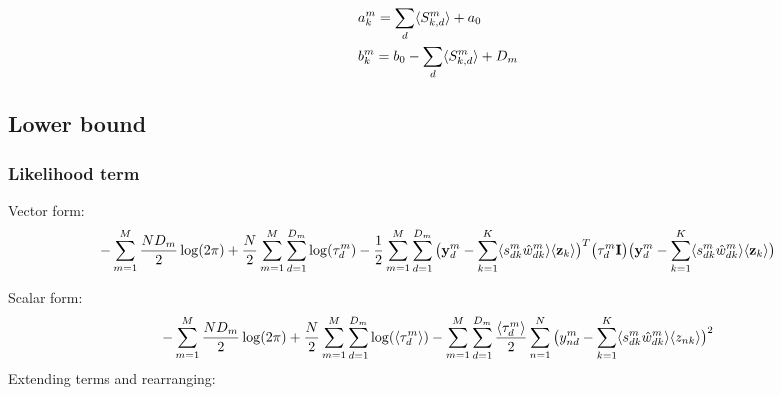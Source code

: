 \documentclass[10pt, a4paper,openany]{report}
\begin{document}
\begin{equation*}
  \begin{aligned}
    &a_{k}^m = \sum_{d} \langle S^m_{k,d}\rangle + a_0\\
    &b_{k}^m = b_0 - \sum_{d} \langle S^m_{k,d}\rangle + D_m
  \end{aligned}
\end{equation*}

\subsection{Lower bound}

\subsubsection{Likelihood term}
Vector form:
\[
-\sum_{m=1}^M \frac{ND_m}{2} \log(2\pi) + \frac{N}{2}\sum_{m=1}^{M}\sum_{d=1}^{D_m}\log(\tau_d^m) - \frac{1}{2} \sum_{m=1}^{M}\sum_{d=1}^{D_m} \big( {\bf y}_d^m - \sum_{k=1}^{K}\langle s_{dk}^m \hat{w}_{dk}^m \rangle \langle {\bf z}_k \rangle \big)^T \big( \tau_d^m {\bf I} \big) \big( {\bf y}_d^m - \sum_{k=1}^{K}\langle s_{dk}^m \hat{w}_{dk}^m \rangle \langle {\bf z}_k \rangle \big)
\]

Scalar form:
\[
-\sum_{m=1}^M \frac{ND_m}{2} \log(2\pi) + \frac{N}{2} \sum_{m=1}^M \sum_{d=1}^{D_m} \log(\langle \tau_d^m \rangle) -\sum_{m=1}^M \sum_{d=1}^{D_m} \frac{\langle \tau_d^m \rangle}{2} \sum_{n=1}^{N} \big( y_{nd}^m - \sum_{k=1}^{K}\langle s_{dk}^m \hat{w}_{dk}^m \rangle \langle z_{nk} \rangle \big)^2
\]
Extending terms and rearranging:
\end{document}
